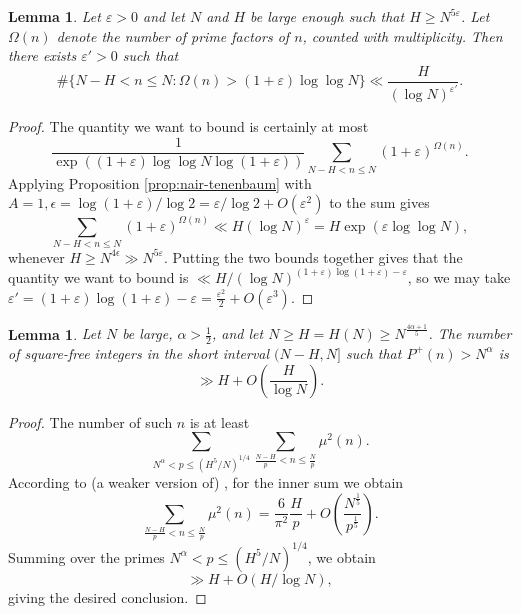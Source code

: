 \documentclass[11pt]{tran-l}
\newtheorem{lemma}[theorem]{Lemma}
\theoremstyle{definition}
\theoremstyle{remark}
\numberwithin{equation}{section}
\begin{document}
\begin{lemma}\label{lemma:tooManyPrimes}
    Let $\varepsilon>0$ and let $N$ and $H$ be large enough such that $H\geq N^{5\varepsilon}$. Let $\Omega(n)$ denote the number of prime factors of $n$, counted with multiplicity. Then there exists $\varepsilon'>0$ such that 
    \begin{equation*}
        \#\{N-H<n\leq N : \Omega(n)>(1+\varepsilon)\log\log N\}\ll \frac{H}{(\log N)^{\varepsilon'}}.
    \end{equation*}
\end{lemma}

\begin{proof}
The quantity we want to bound is certainly at most 
\begin{equation*}
    \frac{1}{\exp((1+\varepsilon)\log\log N\log(1+\varepsilon))}\sum_{N-H<n\leq N} (1+\varepsilon)^{\Omega(n)}.
\end{equation*}
Applying Proposition \ref{prop:nair-tenenbaum} with  $A=1, \epsilon = \log(1+\varepsilon)/\log 2=\varepsilon/\log 2 +O(\varepsilon^2)$ to the sum gives 
\begin{equation*}
    \sum_{N-H<n\leq N} (1+\varepsilon)^{\Omega(n)}\ll H(\log N)^{\varepsilon} = H\exp(\varepsilon\log\log N),
\end{equation*}
whenever $H\geq N^{4\epsilon}\gg N^{5\varepsilon}$. Putting the two bounds together gives that the quantity we want to bound is $\ll H/(\log N)^{(1+\varepsilon)\log(1+\varepsilon)-\varepsilon}$, so we may take $\varepsilon' = (1+\varepsilon)\log(1+\varepsilon)-\varepsilon = \frac{\varepsilon^2}{2} + O(\varepsilon^3)$. 
\end{proof}

\begin{lemma}\label{lemma:unSmoothSquarefree}
    Let $N$ be large, $\alpha>\frac{1}{2}$, and let $N\geq H=H(N)\geq N^{\frac{4\alpha + 1}{5}}$. The number of square-free integers in the short interval $(N-H, N]$ such that $P^+(n)>N^{\alpha}$ is 
    \begin{equation*}
        \gg H+O\left(\frac{H}{\log N} \right).
    \end{equation*}
\end{lemma}

\begin{proof}
    The number of such $n$ is at least
    \begin{equation*}
        \sum_{N^{\alpha} < p\leq (H^5/N)^{1/4}}\sum_{\frac{N-H}{p}<n\leq \frac{N}{p}}\mu^2(n).
    \end{equation*}
    According to (a weaker version of) \cite[Theorem 1.1]{Pandey2024Squarefree}, for the inner sum we obtain 
    \begin{equation*}
        \sum_{\frac{N-H}{p}<n\leq \frac{N}{p}}\mu^2 (n) = \frac{6}{\pi^2}\frac{H}{p} + O\left(\frac{N^{\frac{1}{5}}}{p^{\frac{1}{5}}} \right).
    \end{equation*}
    Summing over the primes $N^{\alpha}<p\leq (H^5/N)^{1/4}$, we obtain 
    \begin{equation*}
        \gg H+O\left(H/\log N \right),
    \end{equation*}
giving the desired conclusion. 
\end{proof}
\end{document}
